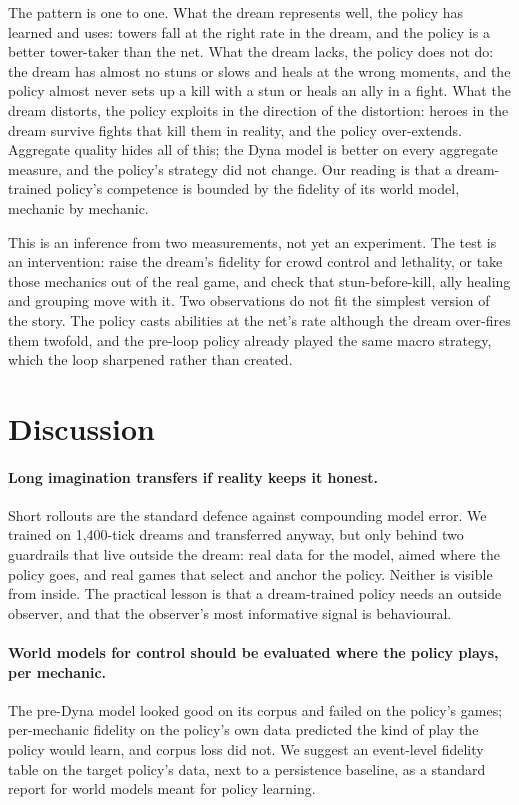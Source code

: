 \documentclass[11pt]{article}
\begin{document}
The pattern is one to one. What the dream represents well, the policy has learned and uses: towers fall at the right rate in the dream, and the policy is a better tower-taker than the net. What the dream lacks, the policy does not do: the dream has almost no stuns or slows and heals at the wrong moments, and the policy almost never sets up a kill with a stun or heals an ally in a fight. What the dream distorts, the policy exploits in the direction of the distortion: heroes in the dream survive fights that kill them in reality, and the policy over-extends. Aggregate quality hides all of this; the Dyna model is better on every aggregate measure, and the policy's strategy did not change. Our reading is that a dream-trained policy's competence is bounded by the fidelity of its world model, mechanic by mechanic.

This is an inference from two measurements, not yet an experiment. The test is an intervention: raise the dream's fidelity for crowd control and lethality, or take those mechanics out of the real game, and check that stun-before-kill, ally healing and grouping move with it. Two observations do not fit the simplest version of the story. The policy casts abilities at the net's rate although the dream over-fires them twofold, and the pre-loop policy already played the same macro strategy, which the loop sharpened rather than created.

\section{Discussion}
\label{sec:discussion}

\paragraph{Long imagination transfers if reality keeps it honest.} Short rollouts are the standard defence against compounding model error. We trained on 1,400-tick dreams and transferred anyway, but only behind two guardrails that live outside the dream: real data for the model, aimed where the policy goes, and real games that select and anchor the policy. Neither is visible from inside. The practical lesson is that a dream-trained policy needs an outside observer, and that the observer's most informative signal is behavioural.

\paragraph{World models for control should be evaluated where the policy plays, per mechanic.} The pre-Dyna model looked good on its corpus and failed on the policy's games; per-mechanic fidelity on the policy's own data predicted the kind of play the policy would learn, and corpus loss did not. We suggest an event-level fidelity table on the target policy's data, next to a persistence baseline, as a standard report for world models meant for policy learning.
\end{document}
